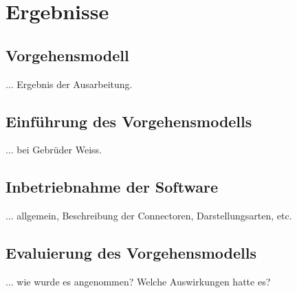 \chapter{Ergebnisse}

\section{Vorgehensmodell}

... Ergebnis der Ausarbeitung.

\section{Einführung des Vorgehensmodells}

... bei Gebrüder Weiss.

\section{Inbetriebnahme der Software}

... allgemein, Beschreibung der Connectoren, Darstellungsarten, etc.

\section{Evaluierung des Vorgehensmodells}

... wie wurde es angenommen? Welche Auswirkungen hatte es?
